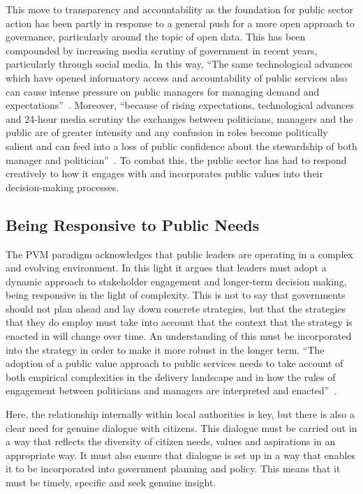 \documentclass[conference]{IEEEtran}
\begin{document}
This move to transparency and accountability as the foundation for
public sector action has been partly in response to a general push for
a more open approach to governance, particularly around the topic of
open data. This has been compounded by increasing media scrutiny of
government in recent years, particularly through social media. In this
way, ``The same technological advances which have opened informatory
access and accountability of public services also can cause intense
pressure on public managers for managing demand and
expectations''~\cite{gains+stoker:2009}.  Moreover, ``because of
rising expectations, technological advances and 24-hour media scrutiny
the exchanges between politicians, managers and the public are of
greater intensity and any confusion in roles become politically
salient and can feed into a loss of public confidence about the
stewardship of both manager and
politician''~\cite{gains+stoker:2009}. To combat this, the public
sector has had to respond creatively to how it engages with and
incorporates public values into their decision-making processes.


\subsection{Being Responsive to Public Needs}
The PVM paradigm acknowledges that public leaders are operating in a
complex and evolving environment. In this light it argues that leaders
must adopt a dynamic approach to stakeholder engagement and
longer-term decision making, being responsive in the light of
complexity. This is not to say that governments should not plan ahead
and lay down concrete strategies, but that the strategies that they do
employ must take into account that the context that the strategy is
enacted in will change over time.  An understanding of this must be
incorporated into the strategy in order to make it more robust in the
longer term. ``The adoption of a public value approach to public
services needs to take account of both empirical complexities in the
delivery landscape and in how the rules of engagement between
politicians and managers are interpreted and
enacted''~\cite{gains+stoker:2009}.

Here, the relationship internally within local authorities is key, but
there is also a clear need for genuine dialogue with citizens. This
dialogue must be carried out in a way that reflects the diversity of
citizen needs, values and aspirations in an appropriate way. It must
also ensure that dialogue is set up in a way that enables it to be
incorporated into government planning and policy. This means that it
must be timely, specific and seek genuine insight.
\end{document}
